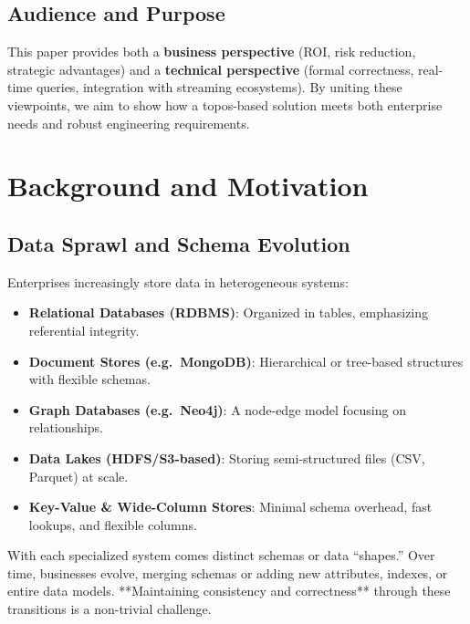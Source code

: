 \documentclass[11pt]{article}
\begin{document}
\subsection{Audience and Purpose}
This paper provides both a \textbf{business perspective} (ROI, risk reduction, strategic advantages) and a \textbf{technical perspective} (formal correctness, real-time queries, integration with streaming ecosystems). By uniting these viewpoints, we aim to show how a topos-based solution meets both enterprise needs and robust engineering requirements.

\section{Background and Motivation}
\label{sec:motivation}

\subsection{Data Sprawl and Schema Evolution}
Enterprises increasingly store data in heterogeneous systems:
\begin{itemize}
\item \textbf{Relational Databases (RDBMS)}: Organized in tables, emphasizing referential integrity.
\item \textbf{Document Stores (e.g.\ MongoDB)}: Hierarchical or tree-based structures with flexible schemas.
\item \textbf{Graph Databases (e.g.\ Neo4j)}: A node-edge model focusing on relationships.
\item \textbf{Data Lakes (HDFS/S3-based)}: Storing semi-structured files (CSV, Parquet) at scale.
\item \textbf{Key-Value \& Wide-Column Stores}: Minimal schema overhead, fast lookups, and flexible columns.
\end{itemize}

With each specialized system comes distinct schemas or data “shapes.” Over time, businesses evolve, merging schemas or adding new attributes, indexes, or entire data models. **Maintaining consistency and correctness** through these transitions is a non-trivial challenge.
\end{document}
